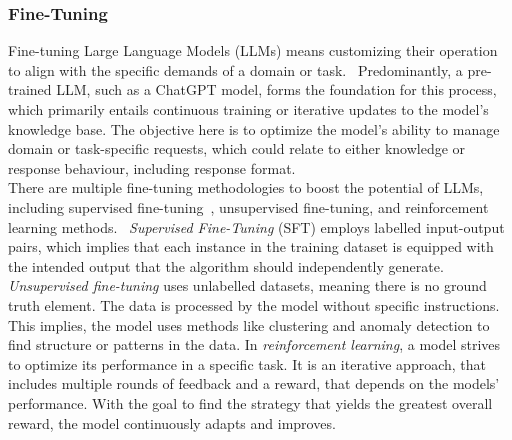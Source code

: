 \subsubsection*{Fine-Tuning}\label{sec:fine-tuning-def}
Fine-tuning Large Language Models (LLMs) means customizing their operation to align with the specific demands of a domain or task.~\cite{ovadia_fine-tuning_2024} Predominantly, a pre-trained LLM, such as a ChatGPT model, forms the foundation for this process, which primarily entails continuous training or iterative updates to the model's knowledge base. The objective here is to optimize the model's ability to manage domain or task-specific requests, which could relate to either knowledge or response behaviour, including response format.\\
There are multiple fine-tuning methodologies to boost the potential of LLMs, including supervised fine-tuning~\cite{zhou_enhancing_2024}, unsupervised fine-tuning, and reinforcement learning methods.~\cite{touvron_llama_2023} \emph{Supervised Fine-Tuning} (SFT) employs labelled input-output pairs, which implies that each instance in the training dataset is equipped with the intended output that the algorithm should independently generate. \emph{Unsupervised fine-tuning} uses unlabelled datasets, meaning there is no ground truth element. The data is processed by the model without specific instructions. This implies, the model uses methods like clustering and anomaly detection to find structure or patterns in the data. In \emph{reinforcement learning}, a model strives to optimize its performance in a specific task. It is an iterative approach, that includes multiple rounds of feedback and a reward, that  depends on the models' performance. With the goal to find the strategy that yields the greatest overall reward, the model continuously adapts and improves.~\cite{ovadia_fine-tuning_2024}

